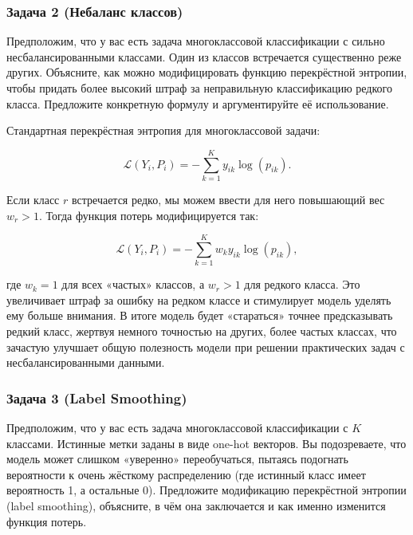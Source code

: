 \subsubsection*{Задача 2 (Небаланс классов)}

Предположим, что у вас есть задача многоклассовой классификации с сильно несбалансированными классами. Один из классов встречается существенно реже других. Объясните, как можно модифицировать функцию перекрёстной энтропии, чтобы придать более высокий штраф за неправильную классификацию редкого класса. Предложите конкретную формулу и аргументируйте её использование.

\begin{solution}
    Стандартная перекрёстная энтропия для многоклассовой задачи:

    $$
        \mathcal{L}(Y_i, P_i) = -\sum_{k=1}^K y_{ik}\log(p_{ik}).
    $$

    Если класс $r$ встречается редко, мы можем ввести для него повышающий вес $w_r > 1$. Тогда функция потерь модифицируется так:

    $$
        \mathcal{L}(Y_i, P_i) = -\sum_{k=1}^K w_k y_{ik}\log(p_{ik}),
    $$

    где $w_k = 1$ для всех «частых» классов, а $w_r > 1$ для редкого класса. Это увеличивает штраф за ошибку на редком классе и стимулирует модель уделять ему больше внимания. В итоге модель будет «стараться» точнее предсказывать редкий класс, жертвуя немного точностью на других, более частых классах, что зачастую улучшает общую полезность модели при решении практических задач с несбалансированными данными.
\end{solution}

\subsubsection*{Задача 3 (Label Smoothing)}

Предположим, что у вас есть задача многоклассовой классификации с $K$ классами. Истинные метки заданы в виде one-hot векторов. Вы подозреваете, что модель может слишком «уверенно» переобучаться, пытаясь подогнать вероятности к очень жёсткому распределению (где истинный класс имеет вероятность 1, а остальные 0). Предложите модификацию перекрёстной энтропии (label smoothing), объясните, в чём она заключается и как именно изменится функция потерь.


